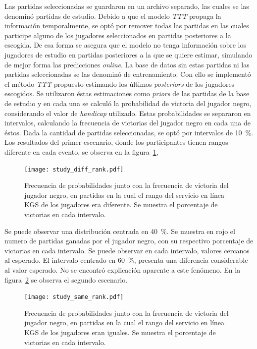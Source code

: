 \documentclass[11pt,twoside,spanish]{report} %
\begin{document}
Las partidas seleccionadas se guardaron en un archivo separado, las cuales se las denomin\'o  partidas de estudio.
Debido a que el modelo \textit{TTT} propaga la informaci\'on temporalmente, se opt\'o por remover todas las partidas en las cuales participe alguno de los jugadores seleccionados en partidas posteriores a la escogida.
De esa forma se asegura que el modelo no tenga informaci\'on sobre los jugadores de estudio en partidas posteriores a la que se quiere estimar, simulando de mejor forma las predicciones \textit{online}.
La base de datos sin estas partidas ni las partidas seleccionadas se las denomin\'o de entrenamiento.
Con ello se implement\'o el m\'etodo \textit{TTT} propuesto estimando los \'ultimos \textit{posteriors} de los jugadores escogidos.
Se utilizaron \'estas estimaciones como \textit{priors} de las partidas de la base de estudio y en cada una se calcul\'o la probabilidad de victoria del jugador negro, considerando el valor de \textit{handicap} utilizado.
Estas probabilidades se separaron en intervalos, calculando la frecuencia de victorias del jugador negro en cada una de \'estos.
Dada la cantidad de partidas seleccionadas, se opt\'o por intervalos de \SI{10}{\percent}.
Los resultados del primer escenario, donde los participantes tienen rangos diferente en cada evento, se observa en la figura~\ref{fig:diffRank}, 

\begin{figure}[H]
    \centering
    \texttt{[image: study\_diff\_rank.pdf]}
    \caption{Frecuencia de probabilidades junto con la frecuencia de victoria del jugador negro, en partidas en la cual el rango del servicio en l\'inea KGS de los jugadores era diferente. Se muestra el porcentaje de victorias en cada intervalo.}
    \label{fig:diffRank}
\end{figure}

Se puede observar una distribuci\'on centrada en  \SI{40}{\percent}. 
Se muestra en rojo el numero de partidas ganadas por el jugador negro, con su respectivo porcentaje de victorias en cada intervalo.
Se puede observar en cada intervalo, valores cercanos al esperado.
El intervalo centrado en \SI{60}{\percent}, presenta una diferencia considerable al valor esperado.
No se encontr\'o explicaci\'on aparente a este fen\'omeno.
En la figura~\ref{fig:sameRank} se observa el segundo escenario.


\begin{figure}[H]
    \centering
    \texttt{[image: study\_same\_rank.pdf]}
    \caption{Frecuencia de probabilidades junto con la frecuencia de victoria del jugador negro, en partidas en la cual el rango del servicio en l\'inea KGS de los jugadores eran iguales. Se muestra el porcentaje de victorias en cada intervalo.}
    \label{fig:sameRank}
\end{figure}
\end{document}
